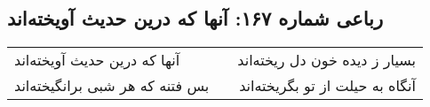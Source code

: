 \begin{center}
\section*{رباعی شماره ۱۶۷: آنها که درین حدیث آویخته‌اند}
\label{sec:sh167}
\begin{longtable}{l p{0.5cm} r}
آنها که درین حدیث آویخته‌اند
&&
بسیار ز دیده خون دل ریخته‌اند
\\
بس فتنه که هر شبی برانگیخته‌اند
&&
آنگاه به حیلت از تو بگریخته‌اند
\\
\end{longtable}
\end{center}
